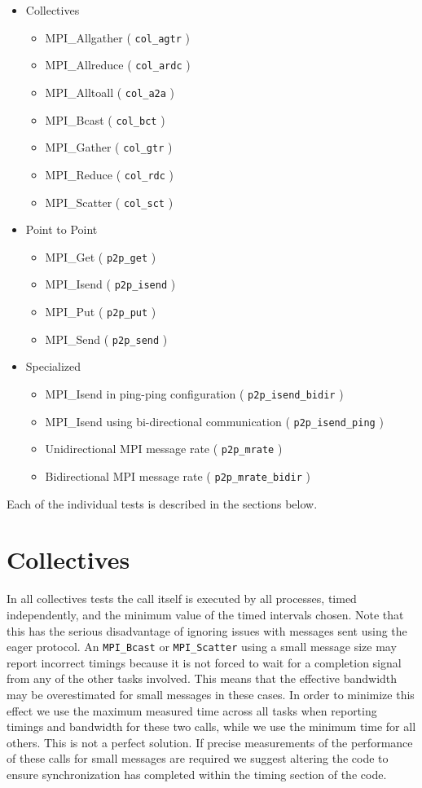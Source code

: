 \documentclass[10pt,a4paper]{report}
\begin{document}
\begin{itemize}
\item{Collectives}
\begin{itemize}
	\item{MPI\_Allgather ( \texttt{col\_agtr} )}
	\item{MPI\_Allreduce ( \texttt{col\_ardc} )}
	\item{MPI\_Alltoall ( \texttt{col\_a2a} )}
	\item{MPI\_Bcast ( \texttt{col\_bct} )}
	\item{MPI\_Gather ( \texttt{col\_gtr} )}
	\item{MPI\_Reduce ( \texttt{col\_rdc} )}
	\item{MPI\_Scatter ( \texttt{col\_sct} )}
\end{itemize}
\item{Point to Point}
\begin{itemize}
	\item{MPI\_Get ( \texttt{p2p\_get} )}
	\item{MPI\_Isend ( \texttt{p2p\_isend} )}
	\item{MPI\_Put ( \texttt{p2p\_put} )}
	\item{MPI\_Send ( \texttt{p2p\_send} )}
\end{itemize}
\item{Specialized}
\begin{itemize}
	\item{MPI\_Isend in ping-ping configuration ( \texttt{p2p\_isend\_bidir} )}
	\item{MPI\_Isend using bi-directional communication ( \texttt{p2p\_isend\_ping} )}
	\item{Unidirectional MPI message rate ( \texttt{p2p\_mrate} )}
	\item{Bidirectional MPI message rate ( \texttt{p2p\_mrate\_bidir} )}
\end{itemize}
\end{itemize}

Each of the individual tests is described in the sections below.

\section{Collectives}
\label{sec:collectives}

In all collectives tests the call itself is executed by all processes, timed independently, and the minimum value of the timed intervals chosen. Note that this has the serious disadvantage of ignoring issues with messages sent using the eager protocol. An \verb+MPI_Bcast+ or \verb+MPI_Scatter+ using a small message size may report incorrect timings because it is not forced to wait for a completion signal from any of the other tasks involved. This means that the effective bandwidth may be overestimated for small messages in these cases. In order to minimize this effect we use the maximum measured time across all tasks when reporting timings and bandwidth for these two calls, while we use the minimum time for all others. This is not a perfect solution. If precise measurements of the performance of these calls for small messages are required we suggest altering the code to ensure synchronization has completed within the timing section of the code. 
\end{document}
